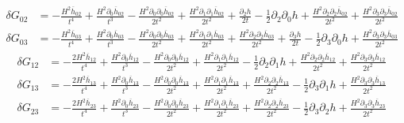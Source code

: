 \documentclass[10pt,letterpaper]{article}
\begin{document}
\begin{align}
	\delta G_{02} &= - \frac{H^2 \overline{h}_{02}}{t^4} + \frac{H^2 \partial_{0}\overline{h}_{02}}{t^3} -  \frac{H^2 \partial_{0}\partial_{0}\overline{h}_{02}}{2 t^2} + \frac{H^2 \partial_{1}\partial_{1}\overline{h}_{02}}{2 t^2} + \frac{\partial_{2}h}{2 t} -  \tfrac{1}{2} \partial_{2}\partial_{0}h + \frac{H^2 \partial_{2}\partial_{2}\overline{h}_{02}}{2 t^2} + \frac{H^2 \partial_{3}\partial_{3}\overline{h}_{02}}{2 t^2}
\end{align}
\begin{align}
	\delta G_{03} &= - \frac{H^2 \overline{h}_{03}}{t^4} + \frac{H^2 \partial_{0}\overline{h}_{03}}{t^3} -  \frac{H^2 \partial_{0}\partial_{0}\overline{h}_{03}}{2 t^2} + \frac{H^2 \partial_{1}\partial_{1}\overline{h}_{03}}{2 t^2} + \frac{H^2 \partial_{2}\partial_{2}\overline{h}_{03}}{2 t^2} + \frac{\partial_{3}h}{2 t} -  \tfrac{1}{2} \partial_{3}\partial_{0}h + \frac{H^2 \partial_{3}\partial_{3}\overline{h}_{03}}{2 t^2}
\end{align}
\begin{align}
	\delta G_{12} &=- \frac{2 H^2 \overline{h}_{12}}{t^4} + \frac{H^2 \partial_{0}\overline{h}_{12}}{t^3} -  \frac{H^2 \partial_{0}\partial_{0}\overline{h}_{12}}{2 t^2} + \frac{H^2 \partial_{1}\partial_{1}\overline{h}_{12}}{2 t^2} -  \tfrac{1}{2} \partial_{2}\partial_{1}h + \frac{H^2 \partial_{2}\partial_{2}\overline{h}_{12}}{2 t^2} + \frac{H^2 \partial_{3}\partial_{3}\overline{h}_{12}}{2 t^2}
\end{align}
\begin{align}
	\delta G_{13} &=- \frac{2 H^2 \overline{h}_{13}}{t^4} + \frac{H^2 \partial_{0}\overline{h}_{13}}{t^3} -  \frac{H^2 \partial_{0}\partial_{0}\overline{h}_{13}}{2 t^2} + \frac{H^2 \partial_{1}\partial_{1}\overline{h}_{13}}{2 t^2} + \frac{H^2 \partial_{2}\partial_{2}\overline{h}_{13}}{2 t^2} -  \tfrac{1}{2} \partial_{3}\partial_{1}h + \frac{H^2 \partial_{3}\partial_{3}\overline{h}_{13}}{2 t^2}
\end{align}
\begin{align}
	\delta G_{23} &=- \frac{2 H^2 \overline{h}_{23}}{t^4} + \frac{H^2 \partial_{0}\overline{h}_{23}}{t^3} -  \frac{H^2 \partial_{0}\partial_{0}\overline{h}_{23}}{2 t^2} + \frac{H^2 \partial_{1}\partial_{1}\overline{h}_{23}}{2 t^2} + \frac{H^2 \partial_{2}\partial_{2}\overline{h}_{23}}{2 t^2} -  \tfrac{1}{2} \partial_{3}\partial_{2}h + \frac{H^2 \partial_{3}\partial_{3}\overline{h}_{23}}{2 t^2}
\end{align}
\end{document}

